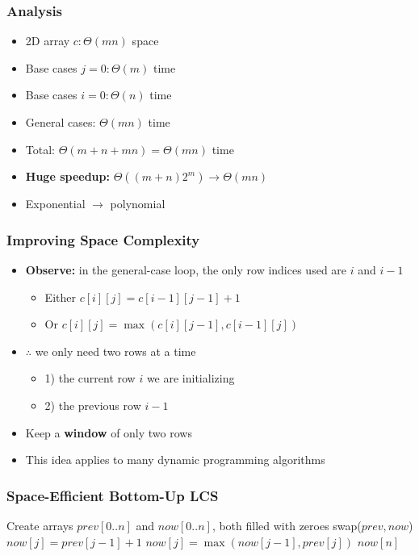 \documentclass{beamer}
\begin{document}
\begin{frame} \frametitle{Analysis}
  \begin{itemize}
  \item 2D array $c: \Theta(mn)$ space
  \item Base cases $j=0: \Theta(m)$ time
  \item Base cases $i=0: \Theta(n)$ time
  \item General cases: $\Theta(mn)$ time
  \item Total: $\Theta(m+n+mn)=\Theta(mn)$ time
  \item \textbf{Huge speedup:} $\Theta((m+n) 2^m) \longrightarrow \Theta(mn)$
  \item Exponential $\longrightarrow$ polynomial
  \end{itemize}
\end{frame}

\begin{frame} \frametitle{Improving Space Complexity}
  \begin{itemize}
  \item \textbf{Observe:} in the general-case loop, the only row indices used are $i$ and $i-1$
    \begin{itemize}
    \item Either $c[i][j] = c[i-1][j-1]+1$
    \item Or $c[i][j] = \max(c[i][j-1], c[i-1][j])$
    \end{itemize}
  \item $\therefore$ we only need two rows at a time
    \begin{itemize}
    \item 1) the current row $i$ we are initializing
    \item 2) the previous row $i-1$
    \end{itemize}
  \item Keep a \textbf{window} of only two rows
  \item This idea applies to many dynamic programming algorithms
  \end{itemize}
\end{frame}

\begin{frame} \frametitle{Space-Efficient Bottom-Up LCS}
  {\small
  \begin{algorithmic}[1]
    \State Create arrays $prev[0..n]$ and $now[0..n]$, both filled with zeroes
      \State swap($prev, now$)  
          \State $now[j] = prev[j-1]+1$
        \Else
          \State $now[j] = \max(now[j-1], prev[j])$
        \EndIf
      \EndFor
      \EndFor
    \State \Return $now[n]$
    \EndFunction
  \end{algorithmic}
  }
\end{frame}
\end{document}
